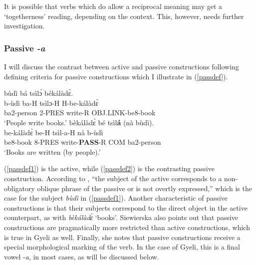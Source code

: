 It is possible that verbs which do allow a reciprocal meaning may get a `togetherness' reading, depending on the context. This, however, needs further investigation.





\subsubsection{Passive \textit{-a}}
\label{sec:PASS}

I will discuss the contrast between active and passive constructions following  defining criteria for passive constructions which I illustrate in (\ref{passdef}).

\begin{exe}
\ex\label{passdef}
\begin{xlist}
\ex \label{passdef1}
  \glll  bùdì bá tsìlɔ́ békálàdɛ̀.\\
	b-ùdì ba-H tsìlɔ-H H-be-kálàdɛ̀ \\
             ba2-person 2-PRES write-R OBJ.LINK-be8-book  \\
    \trans `People write books.'
\ex\label{passdef2}
 \glll  bèkálàdɛ̀ bé tsìl{\bfseries á} (nà bùdì). \\
	be-kálàdɛ̀ be-H tsìl-a-H nà b-ùdì \\
         be8-book 8-PRES write-{\bfseries PASS}-R COM ba2-person  \\
    \trans `Books are written (by people).'
\end{xlist}
\end{exe}


\noindent  (\ref{passdef1}) is the active, while (\ref{passdef2}) is the contrasting passive construction. According to \citet{siewierska2013}, ``the subject of the active corresponds to a non-obligatory oblique phrase of the passive or is not overtly expressed,'' which is the case for the subject {\itshape bùdì} in (\ref{passdef1}). Another characteristic of passive constructions is that their subjects correspond to the direct object in the active counterpart, as with {\itshape bèkálàdɛ̀} `books'. Siewierska also points out that passive constructions are pragmatically more restricted than active constructions, which is true in Gyeli as well. Finally, she notes that passive constructions receive a special morphological marking of the verb. In the case of Gyeli, this is a final vowel -{\itshape a}, in most cases, as will be discussed below.

